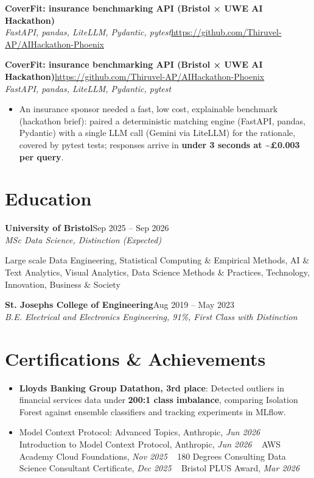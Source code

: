 \documentclass[a4paper,11pt]{article}
\newcommand{\roleNoLoc}[3]{\textbf{#1}\hfill{\color{muted}#2}\\ \textit{#3}\par}
\newcommand{\project}[3]{%
  \textbf{#1}\hfill#3\\ {\color{muted}\small\textit{#2}}\par}
\newcommand{\gap}{\vspace{5pt}}
\newcommand{\num}[1]{\textbf{#1}}   %
\begin{document}
\else
\textbf{CoverFit: insurance benchmarking API (Bristol × UWE AI Hackathon)}\\ {\color{muted}\small\textit{FastAPI, pandas, LiteLLM, Pydantic, pytest}}\hfill{\small\url{https://github.com/Thiruvel-AP/AIHackathon-Phoenix}}\par
\fi
\else
\project{CoverFit: insurance benchmarking API (Bristol × UWE AI Hackathon)}{FastAPI, pandas, LiteLLM, Pydantic, pytest}{\url{https://github.com/Thiruvel-AP/AIHackathon-Phoenix}}
\fi
\begin{itemize}
  \item An insurance sponsor needed a fast, low cost, explainable benchmark (hackathon brief): paired a deterministic matching engine (FastAPI, pandas, Pydantic) with a single LLM call (Gemini via LiteLLM) for the rationale, covered by pytest tests; responses arrive in \num{under 3 seconds at \textasciitilde{}£0.003 per query}.
\end{itemize}

\section{Education}
\roleNoLoc{University of Bristol}{Sep 2025 – Sep 2026}{MSc Data Science, Distinction \textit{(Expected)}}
{\color{muted}\small Large scale Data Engineering, Statistical Computing \& Empirical Methods, AI \& Text Analytics, Visual Analytics, Data Science Methods \& Practices, Technology, Innovation, Business \& Society}\par
\gap
{}
\roleNoLoc{St. Joseph\textquotesingle{}s College of Engineering}{Aug 2019 – May 2023}{B.E. Electrical and Electronics Engineering, 91\%, First Class with Distinction}

\section{Certifications \& Achievements}
\begin{itemize}
  \item \textbf{Lloyd\textquotesingle{}s Banking Group Datathon, 3rd place}: Detected outliers in financial services data under \num{200:1 class imbalance}, comparing Isolation Forest against ensemble classifiers and tracking experiments in MLflow.
  \item Model Context Protocol: Advanced Topics, Anthropic, \textit{Jun 2026}\nobreak\ \,\textperiodcentered\, Introduction to Model Context Protocol, Anthropic, \textit{Jun 2026}\nobreak\ \,\textperiodcentered\, AWS Academy Cloud Foundations, \textit{Nov 2025}\nobreak\ \,\textperiodcentered\, 180 Degrees Consulting Data Science Consultant Certificate, \textit{Dec 2025}\nobreak\ \,\textperiodcentered\, Bristol PLUS Award, \textit{Mar 2026}
\end{itemize}
\end{document}
